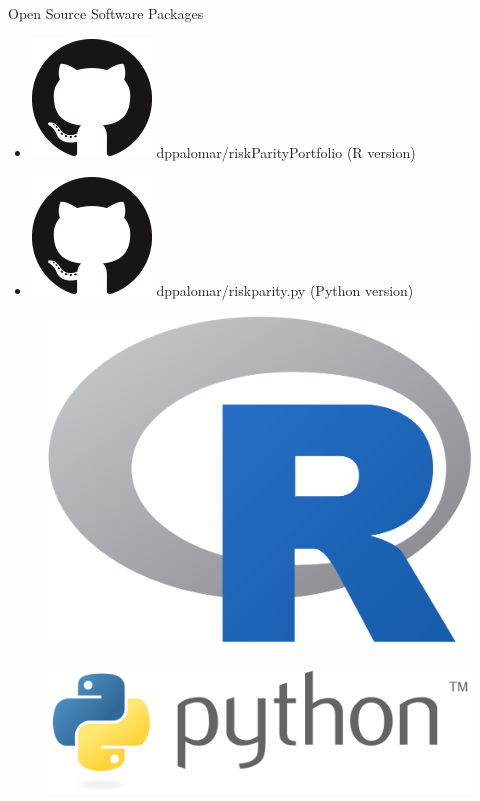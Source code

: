 \documentclass{beamer}
\begin{document}
        \begin{frame}{Open Source Software Packages}
          \begin{itemize}
            \item[] \includegraphics[scale=.1]{images/github.png}  dppalomar/riskParityPortfolio (R version)
            \item[] \includegraphics[scale=.1]{images/github.png} dppalomar/riskparity.py (Python version)
          \end{itemize}
          \begin{figure}[!htb]
            \centering
            \includegraphics[scale=0.1]{images/r.png}~
            \includegraphics[scale=0.2]{images/python.png}
          \end{figure}
        \end{frame}
\end{document}
